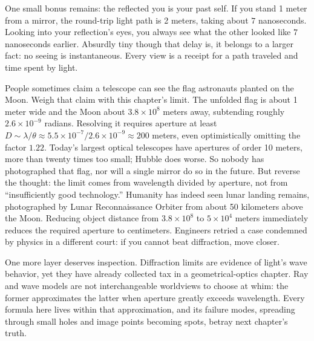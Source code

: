 \begin{mainline}
One small bonus remains: the reflected you is your past self. If you stand 1 meter from a mirror, the round-trip light path is 2 meters, taking about $7$ nanoseconds. Looking into your reflection's eyes, you always see what the other looked like $7$ nanoseconds earlier. Absurdly tiny though that delay is, it belongs to a larger fact: no seeing is instantaneous. Every view is a receipt for a path traveled and time spent by light.


\begin{thought}

People sometimes claim a telescope can see the flag astronauts planted on the Moon. Weigh that claim with this chapter's limit. The unfolded flag is about 1 meter wide and the Moon about $3.8\times10^{8}$ meters away, subtending roughly $2.6\times10^{-9}$ radians. Resolving it requires aperture at least $D\sim\lambda/\theta\approx5.5\times10^{-7}/2.6\times10^{-9}\approx200$ meters, even optimistically omitting the factor $1.22$. Today's largest optical telescopes have apertures of order 10 meters, more than twenty times too small; Hubble does worse. So nobody has photographed that flag, nor will a single mirror do so in the future. But reverse the thought: the limit comes from wavelength divided by aperture, not from ``insufficiently good technology.'' Humanity has indeed seen lunar landing remains, photographed by Lunar Reconnaissance Orbiter from about 50 kilometers above the Moon. Reducing object distance from $3.8\times10^{8}$ to $5\times10^{4}$ meters immediately reduces the required aperture to centimeters. Engineers retried a case condemned by physics in a different court: if you cannot beat diffraction, move closer.

One more layer deserves inspection. Diffraction limits are evidence of light's wave behavior, yet they have already collected tax in a geometrical-optics chapter. Ray and wave models are not interchangeable worldviews to choose at whim: the former approximates the latter when aperture greatly exceeds wavelength. Every formula here lives within that approximation, and its failure modes, spreading through small holes and image points becoming spots, betray next chapter's truth.
\end{thought}


\end{mainline}
